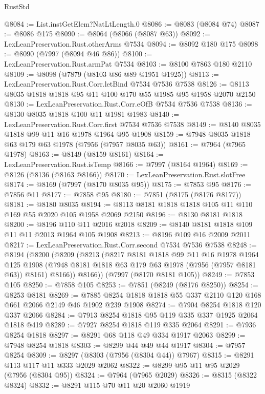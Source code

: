 \begin{lexlean}{RustStd}
\begin{coremodule}
{\begin{coremodule}
{{{{{{{{{{{{{{{{{{{{{{{{{{{{{{{{{{{{{{{{{{{@8084 := List.instGetElem?NatLtLength.{0}
@8086 := @8083 (@8084 @74)
@8087 := @8086 @175
@8090 := @8064 (@8066 (@8087 @63))
@8092 := LexLeanPreservation.Rust.otherArms @7534
@8094 := @8092 @180 @175
@8098 := @8090 (@7997 (@8094 @46 @86))
@8100 := LexLeanPreservation.Rust.armPat @7534
@8103 := @8100 @7863 @180 @2110
@8109 := @8098 (@7879 (@8103 @86 @89 @1951 @1925))
@8113 := LexLeanPreservation.Rust.Corr.letBind @7534 @7536 @7538
@8126 := @8113 @8035 @1818 @1818 @95 @11 @100 @170 @55 @1985 @95 @1958 @2070 @2150
@8130 := LexLeanPreservation.Rust.Corr.eOfB @7534 @7536 @7538
@8136 := @8130 @8035 @1818 @100 @11 @1981 @1983
@8140 := LexLeanPreservation.Rust.Corr.first @7534 @7536 @7538
@8149 := @8140 @8035 @1818 @99 @11 @16 @1978 @1964 @95 @1908
@8159 := @7948 @8035 @1818 @63 @179 @63 @1978 (@7956 (@7957 @8035 @63))
@8161 := @7964 (@7965 @1978)
@8163 := @8149 (@8159 @8161)
@8164 := LexLeanPreservation.Rust.isTemp
@8166 := @7997 (@8164 @1964)
@8169 := @8126 (@8136 (@8163 @8166))
@8170 := LexLeanPreservation.Rust.slotFree
@8174 := @8169 (@7997 (@8170 @8035 @95))
@8175 := @7853 @95
@8176 := @7856 @11
@8177 := @7858 @95
@8180 := @7851 (@8175 (@8176 @8177))
@8181 := @8180 @8035
@8194 := @8113 @8181 @1818 @1818 @105 @11 @110 @169 @55 @2020 @105 @1958 @2069 @2150
@8196 := @8130 @8181 @1818
@8200 := @8196 @110 @11 @2016 @2018
@8209 := @8140 @8181 @1818 @109 @11 @11 @2013 @1964 @105 @1908
@8213 := @8196 @109 @16 @2009 @2011
@8217 := LexLeanPreservation.Rust.Corr.second @7534 @7536 @7538
@8248 := @8194
    (@8200
      (@8209
        (@8213
          (@8217
            @8181
            @1818
            @99
            @11
            @16
            @1978
            @1964
            @125
            @1908
            (@7948 @8181 @1818 @63 @179 @63 @1978 (@7956 (@7957 @8181 @63)) @8161)
            @8166))
        @8166))
    (@7997 (@8170 @8181 @105))
@8249 := @7853 @105
@8250 := @7858 @105
@8253 := @7851 (@8249 (@8176 @8250))
@8254 := @8253 @8181
@8269 := @7885 @8254 @1818 @1818 @55 @337 @2110 @120 @168 @661 @2066 @2149 @46 @1902 @239 @1908
@8274 := @7904 @8254 @1818 @120 @337 @2066
@8284 := @7913 @8254 @1818 @95 @119 @335 @337 @1925 @2064 @1818 @419
@8289 := @7927 @8254 @1818 @119 @335 @2064
@8291 := @7936 @8254 @1818
@8297 := @8291 @68 @118 @49 @334 @1917 @2063
@8299 := @7948 @8254 @1818
@8303 := @8299 @44 @49 @44 @1917
@8304 := @7957 @8254
@8309 := @8297 (@8303 (@7956 (@8304 @44)) @7967)
@8315 := @8291 @113 @117 @11 @333 @2029 @2062
@8322 := @8299 @95 @11 @95 @2029 (@7956 (@8304 @95))
@8324 := @7964 (@7965 @2029)
@8326 := @8315 (@8322 @8324)
@8332 := @8291 @115 @70 @11 @20 @2060 @1919
}}}}}}}}}}}}}}}}}}}}}}}}}}}}}}}}}}}}}}}}}}}
\end{coremodule}}
\end{coremodule}
\end{lexlean}
